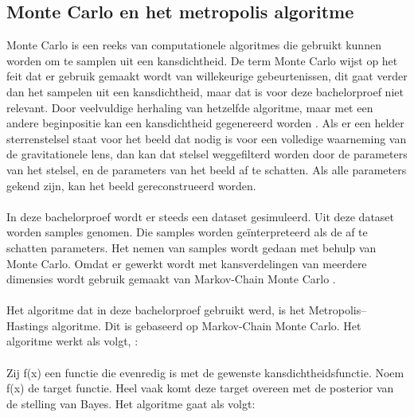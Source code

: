 \subsection{Monte Carlo en het metropolis algoritme}
Monte Carlo is een reeks van computationele algoritmes die gebruikt kunnen worden om te samplen uit een kansdichtheid. De term Monte Carlo wijst op het feit dat er gebruik gemaakt wordt van willekeurige gebeurtenissen, dit gaat verder dan het sampelen uit een kansdichtheid, maar dat is voor deze bachelorproef niet relevant. Door veelvuldige herhaling van hetzelfde algoritme, maar met een andere beginpositie kan een kansdichtheid gegenereerd worden \cite{wikipedia-bijdragers-2023}\cite{kenton-2023}. Als er een helder sterrenstelsel staat voor het beeld dat nodig is voor een volledige waarneming van de gravitationele lens, dan kan dat stelsel weggefilterd worden door de parameters van het stelsel, en de parameters van het beeld af te schatten. Als alle parameters gekend zijn, kan het beeld gereconstrueerd worden.\\ \\
In deze bachelorproef wordt er steeds een dataset gesimuleerd. Uit deze dataset worden samples genomen. Die samples worden geïnterpreteerd als de af te schatten parameters. Het nemen van samples wordt gedaan met behulp van Monte Carlo. Omdat er gewerkt wordt met kansverdelingen van meerdere dimensies wordt gebruik gemaakt van Markov-Chain Monte Carlo \cite{unknown-author-2023-MCMC}.\\ \\
Het algoritme dat in deze bachelorproef gebruikt werd, is het Metropolis–Hastings algoritme. Dit is gebaseerd op Markov-Chain Monte Carlo. Het algoritme werkt als volgt\cite{unknown-author-no-date}, \cite{thijssen-2007}:\\ \\
Zij f(x) een functie die evenredig is met de gewenste kansdichtheidsfunctie. Noem f(x) de target functie. Heel vaak komt deze target overeen met de posterior van de stelling van Bayes. Het algoritme gaat als volgt:

